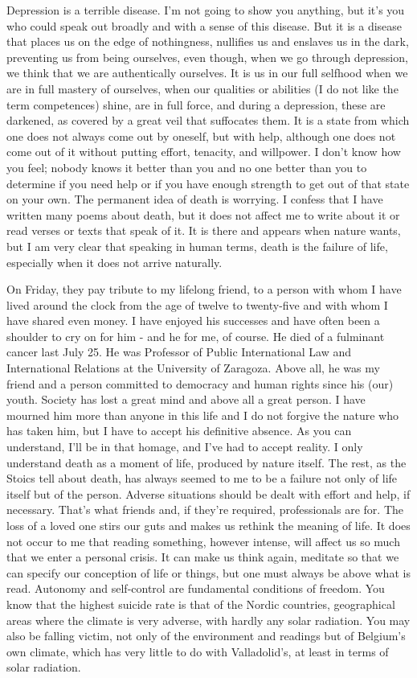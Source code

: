 \documentclass[]{book}
\begin{document}
Depression is a terrible disease. I'm not going to show you anything, but it's you who could speak out broadly and with a sense of this disease. But it is a disease that places us on the edge of nothingness, nullifies us and enslaves us in the dark, preventing us from being ourselves, even though, when we go through depression, we think that we are authentically ourselves. It is us in our full selfhood when we are in full mastery of ourselves, when our qualities or abilities (I do not like the term competences) shine, are in full force, and during a depression, these are darkened, as covered by a great veil that suffocates them. It is a state from which one does not always come out by oneself, but with help, although one does not come out of it without putting effort, tenacity, and willpower. I don't know how you feel; nobody knows it better than you and no one better than you to determine if you need help or if you have enough strength to get out of that state on your own. The permanent idea of death is worrying. I confess that I have written many poems about death, but it does not affect me to write about it or read verses or texts that speak of it. It is there and appears when nature wants, but I am very clear that speaking in human terms, death is the failure of life, especially when it does not arrive naturally.

On Friday, they pay tribute to my lifelong friend, to a person with whom I have lived around the clock from the age of twelve to twenty-five and with whom I have shared even money. I have enjoyed his successes and have often been a shoulder to cry on for him - and he for me, of course. He died of a fulminant cancer last July 25. He was Professor of Public International Law and International Relations at the University of Zaragoza. Above all, he was my friend and a person committed to democracy and human rights since his (our) youth. Society has lost a great mind and above all a great person. I have mourned him more than anyone in this life and I do not forgive the nature who has taken him, but I have to accept his definitive absence. As you can understand, I'll be in that homage, and I've had to accept reality. I only understand death as a moment of life, produced by nature itself. The rest, as the Stoics tell about death, has always seemed to me to be a failure not only of life itself but of the person. Adverse situations should be dealt with effort and help, if necessary. That's what friends and, if they're required, professionals are for. The loss of a loved one stirs our guts and makes us rethink the meaning of life. It does not occur to me that reading something, however intense, will affect us so much that we enter a personal crisis. It can make us think again, meditate so that we can specify our conception of life or things, but one must always be above what is read. Autonomy and self-control are fundamental conditions of freedom. You know that the highest suicide rate is that of the Nordic countries, geographical areas where the climate is very adverse, with hardly any solar radiation. You may also be falling victim, not only of the environment and readings but of Belgium's own climate, which has very little to do with Valladolid's, at least in terms of solar radiation.
\end{document}
